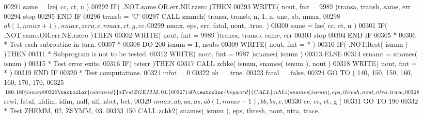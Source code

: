 \begin{DoxyCode}
00291       same = lze( cc, ct, n )
00292       \textcolor{keywordflow}{IF}( .NOT.same.OR.err.NE.rzero )\textcolor{keywordflow}{THEN}
00293          \textcolor{keyword}{WRITE}( nout, fmt = 9989 )transa, transb, same, err
00294          stop
00295 \textcolor{keywordflow}{      END IF}
00296       transb = \textcolor{stringliteral}{'C'}
00297       \textcolor{keyword}{CALL }zmmch( transa, transb, n, 1, n, one, ab, nmax,
00298      $            ab( 1, nmax + 1 ), nmax, zero, c, nmax, ct, g, cc,
00299      $            nmax, eps, err, fatal, nout, .true. )
00300       same = lze( cc, ct, n )
00301       \textcolor{keywordflow}{IF}( .NOT.same.OR.err.NE.rzero )\textcolor{keywordflow}{THEN}
00302          \textcolor{keyword}{WRITE}( nout, fmt = 9989 )transa, transb, same, err
00303          stop
00304 \textcolor{keywordflow}{      END IF}
00305 \textcolor{comment}{*}
00306 \textcolor{comment}{*     Test each subroutine in turn.}
00307 \textcolor{comment}{*}
00308       \textcolor{keywordflow}{DO} 200 isnum = 1, nsubs
00309          \textcolor{keyword}{WRITE}( nout, fmt = * )
00310          \textcolor{keywordflow}{IF}( .NOT.ltest( isnum ) )\textcolor{keywordflow}{THEN}
00311 \textcolor{comment}{*           Subprogram is not to be tested.}
00312             \textcolor{keyword}{WRITE}( nout, fmt = 9987 )snames( isnum )
00313          \textcolor{keywordflow}{ELSE}
00314             srnamt = snames( isnum )
00315 \textcolor{comment}{*           Test error exits.}
00316             \textcolor{keywordflow}{IF}( tsterr )\textcolor{keywordflow}{THEN}
00317                \textcolor{keyword}{CALL }zchke( isnum, snames( isnum ), nout )
00318                \textcolor{keyword}{WRITE}( nout, fmt = * )
00319 \textcolor{keywordflow}{            END IF}
00320 \textcolor{comment}{*           Test computations.}
00321             infot = 0
00322             ok = .true.
00323             fatal = .false.
00324             \textcolor{keywordflow}{GO TO} ( 140, 150, 150, 160, 160, 170, 170,
00325      $              180, 180 )isnum
00326 \textcolor{comment}{*           Test ZGEMM, 01.}
00327   140       \textcolor{keyword}{CALL }zchk1( snames( isnum ), eps, thresh, nout, ntra, trace,
00328      $                  rewi, fatal, nidim, idim, nalf, alf, nbet, bet,
00329      $                  nmax, ab, aa, as, ab( 1, nmax + 1 ), bb, bs, c,
00330      $                  cc, cs, ct, g )
00331             \textcolor{keywordflow}{GO TO} 190
00332 \textcolor{comment}{*           Test ZHEMM, 02, ZSYMM, 03.}
00333   150       \textcolor{keyword}{CALL }zchk2( snames( isnum ), eps, thresh, nout, ntra, trace,

\end{DoxyCode}
